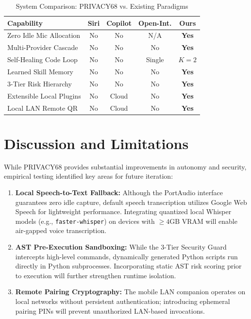 \documentclass[conference]{IEEEtran}
\begin{document}
\begin{table}[htbp]
\centering
\caption{System Comparison: PRIVACY68 vs. Existing Paradigms}
\label{tab:comparison}
\small
\begin{tabularx}{\columnwidth}{|X|c|c|c|c|}
\hline
\textbf{Capability} & \textbf{Siri} & \textbf{Copilot} & \textbf{Open-Int.} & \textbf{Ours} \\ \hline
Zero Idle Mic Allocation & No & No & N/A & \textbf{Yes} \\ \hline
Multi-Provider Cascade & No & No & No & \textbf{Yes} \\ \hline
Self-Healing Code Loop & No & No & Single & \textbf{$K=2$} \\ \hline
Learned Skill Memory & No & No & No & \textbf{Yes} \\ \hline
3-Tier Risk Hierarchy & No & No & No & \textbf{Yes} \\ \hline
Extensible Local Plugins & No & Cloud & No & \textbf{Yes} \\ \hline
Local LAN Remote QR & No & Cloud & No & \textbf{Yes} \\ \hline
\end{tabularx}
\end{table}

\section{Discussion and Limitations}
\label{sec:discussion}
While PRIVACY68 provides substantial improvements in autonomy and security, empirical testing identified key areas for future iteration:
\begin{enumerate}
    \item \textbf{Local Speech-to-Text Fallback:} Although the PortAudio interface guarantees zero idle capture, default speech transcription utilizes Google Web Speech for lightweight performance. Integrating quantized local Whisper models (e.g., \texttt{faster-whisper}) on devices with $\ge 4\text{GB}$ VRAM will enable air-gapped voice transcription.
    \item \textbf{AST Pre-Execution Sandboxing:} While the 3-Tier Security Guard intercepts high-level commands, dynamically generated Python scripts run directly in Python subprocesses. Incorporating static AST risk scoring prior to execution will further strengthen runtime isolation.
    \item \textbf{Remote Pairing Cryptography:} The mobile LAN companion operates on local networks without persistent authentication; introducing ephemeral pairing PINs will prevent unauthorized LAN-based invocations.
\end{enumerate}
\end{document}
